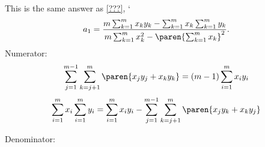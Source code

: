 This is the same answer as \eqref{???},
`  \begin{equation*}   %
      a_{1} = \frac{m \sum_{k=1}^{m}x_{k}y_{k} - \sum_{k=1}^{m}x_{k}\sum_{k=1}^{m}y_{k}} {m \sum_{k=1}^{m}x_{k}^{2} - \paren{\sum_{k=1}^{m}x_{k}}^{2}} .
  \end{equation*}
Numerator:
  \begin{equation*}   %
      \sum_{j=1}^{m-1} \sum_{k=j+1}^{m} \paren{x_{j}y_{j} + x_{k}y_{k}} = (m-1) \sum_{i=1}^{m} x_{i}y_{i}
   \label{eq:rule 1}
  \end{equation*}
  \begin{equation*}   %
   	  \sum_{i=1}^{m}x_{i} \sum_{i=1}^{m}y_{i} = \sum_{i=1}^{m}x_{i}y_{i} - 
      \sum_{j=1}^{m-1} \sum_{k=j+1}^{m} \paren{x_{j}y_{k} + x_{k}y_{j}} 
   \label{eq:rule 2}
  \end{equation*}

Denominator:


\endinput